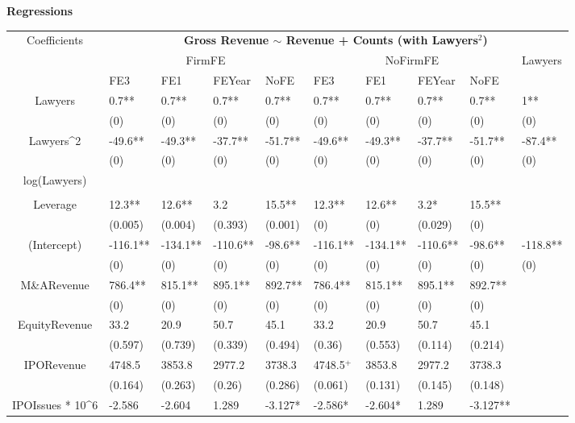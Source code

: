 \documentclass{article}
\begin{document}
\newpage
{\large \textbf{Regressions} }
\begin{table}[H]
\centering
\begin{tabular}{|clllllllll|}
\hline
\multirow{3}{*}{Coefficients} & \multicolumn{9}{c|}{\textbf{Gross Revenue $\sim$ Revenue + Counts (with Lawyers$^2$)}} \\
\cline{2-10}
& \multicolumn{4}{c}{FirmFE} & \multicolumn{4}{c}{NoFirmFE} & \multirow{2}{*}{Lawyers} \\
\cline{2-9}
& FE3 & FE1 & FEYear & NoFE & FE3 & FE1 & FEYear & NoFE &  \\
\hline
 
Lawyers & 0.7** & 0.7** & 0.7** & 0.7** & 0.7** & 0.7** & 0.7** & 0.7** & 1** \\ 
   & (0) & (0) & (0) & (0) & (0) & (0) & (0) & (0) & (0) \\ 
  Lawyers^2 & -49.6** & -49.3** & -37.7** & -51.7** & -49.6** & -49.3** & -37.7** & -51.7** & -87.4** \\ 
   & (0) & (0) & (0) & (0) & (0) & (0) & (0) & (0) & (0) \\ 
  log(Lawyers) &  &  &  &  &  &  &  &  &  \\ 
   &  &  &  &  &  &  &  &  &  \\ 
  Leverage & 12.3** & 12.6** & 3.2 & 15.5** & 12.3** & 12.6** & 3.2* & 15.5** &  \\ 
   & (0.005) & (0.004) & (0.393) & (0.001) & (0) & (0) & (0.029) & (0) &  \\ 
  (Intercept) & -116.1** & -134.1** & -110.6** & -98.6** & -116.1** & -134.1** & -110.6** & -98.6** & -118.8** \\ 
   & (0) & (0) & (0) & (0) & (0) & (0) & (0) & (0) & (0) \\ 
  M\&ARevenue & 786.4** & 815.1** & 895.1** & 892.7** & 786.4** & 815.1** & 895.1** & 892.7** &  \\ 
   & (0) & (0) & (0) & (0) & (0) & (0) & (0) & (0) &  \\ 
  EquityRevenue & 33.2 & 20.9 & 50.7 & 45.1 & 33.2 & 20.9 & 50.7 & 45.1 &  \\ 
   & (0.597) & (0.739) & (0.339) & (0.494) & (0.36) & (0.553) & (0.114) & (0.214) &  \\ 
  IPORevenue & 4748.5 & 3853.8 & 2977.2 & 3738.3 & 4748.5$^{+}$ & 3853.8 & 2977.2 & 3738.3 &  \\ 
   & (0.164) & (0.263) & (0.26) & (0.286) & (0.061) & (0.131) & (0.145) & (0.148) &  \\ 
  IPOIssues * 10^6 & -2.586 & -2.604 & 1.289 & -3.127* & -2.586* & -2.604* & 1.289 & -3.127** &  \\ 

\end{tabular}
\end{table}
\end{document}

